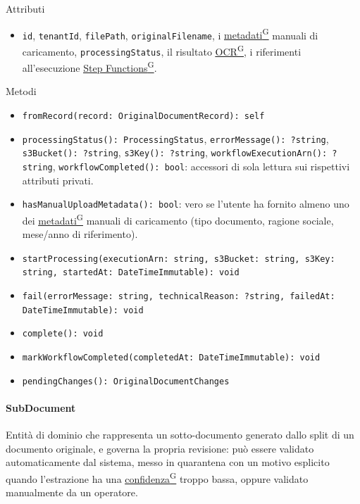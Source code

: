 \documentclass[a4paper,12pt]{article}
\providecommand{\glslink}[2]{\href{https://alittlebyte-19.github.io/Documentazione/glossario.html\#gls-#1}{\underline{#2}\textsuperscript{\scriptsize G}}}
\begin{document}
\begin{sloppypar}
Attributi
\begin{itemize}\raggedright
    \item \texttt{id}, \texttt{tenantId}, \texttt{filePath}, \texttt{originalFilename}, i \glslink{metadati}{metadati} manuali di caricamento, \texttt{processingStatus}, il risultato \glslink{ocr-riconoscimento-ottico-dei-caratteri}{OCR}, i riferimenti all'esecuzione \glslink{step-functions}{Step Functions}.
\end{itemize}

Metodi
\begin{itemize}\raggedright
    \item \texttt{fromRecord(record: OriginalDocumentRecord): self}
    \item \texttt{processingStatus(): ProcessingStatus}, \texttt{errorMessage(): ?string}, \texttt{s3Bucket(): ?string}, \texttt{s3Key(): ?string}, \texttt{workflowExecutionArn(): ?string}, \texttt{workflowCompleted(): bool}: accessori di sola lettura sui rispettivi attributi privati.
    \item \texttt{hasManualUploadMetadata(): bool}: vero se l'utente ha fornito almeno uno dei \glslink{metadati}{metadati} manuali di caricamento (tipo documento, ragione sociale, mese/anno di riferimento).
    \item \texttt{startProcessing(executionArn: string, s3Bucket: string, s3Key: string, startedAt: DateTimeImmutable): void}
    \item \texttt{fail(errorMessage: string, technicalReason: ?string, failedAt: DateTimeImmutable): void}
    \item \texttt{complete(): void}
    \item \texttt{markWorkflowCompleted(completedAt: DateTimeImmutable): void}
    \item \texttt{pendingChanges(): OriginalDocumentChanges}
\end{itemize}

\paragraph{SubDocument}

Entità di dominio che rappresenta un sotto-documento generato dallo split di un documento originale, e governa la propria revisione: può essere validato automaticamente dal sistema, messo in quarantena con un motivo esplicito quando l'estrazione ha una \glslink{confidenza-confidence-score}{confidenza} troppo bassa, oppure validato manualmente da un operatore.


\end{sloppypar}
\end{document}
